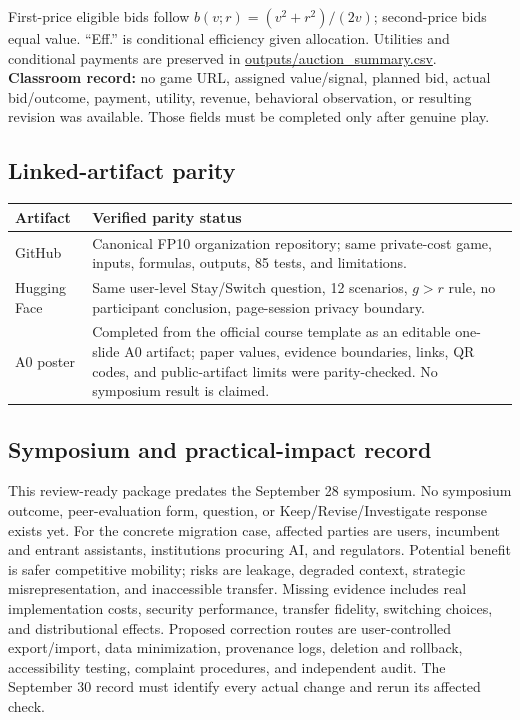 First-price eligible bids follow $b(v;r)=(v^2+r^2)/(2v)$; second-price bids equal value. ``Eff.'' is conditional efficiency given allocation. Utilities and conditional payments are preserved in \url{outputs/auction_summary.csv}. \textbf{Classroom record:} no game URL, assigned value/signal, planned bid, actual bid/outcome, payment, utility, revenue, behavioral observation, or resulting revision was available. Those fields must be completed only after genuine play.

\subsection{Linked-artifact parity}
\begin{tabularx}{\columnwidth}{@{}p{1.55cm}Y@{}}\toprule
\textbf{Artifact}&\textbf{Verified parity status}\\\midrule
GitHub&Canonical FP10 organization repository; same private-cost game, inputs, formulas, outputs, 85 tests, and limitations.\\
Hugging Face&Same user-level Stay/Switch question, 12 scenarios, $g>r$ rule, no participant conclusion, page-session privacy boundary.\\
A0 poster&Completed from the official course template as an editable one-slide A0 artifact; paper values, evidence boundaries, links, QR codes, and public-artifact limits were parity-checked. No symposium result is claimed.\\\bottomrule
\end{tabularx}

\subsection{Symposium and practical-impact record}
This review-ready package predates the September 28 symposium. No symposium outcome, peer-evaluation form, question, or Keep/\allowbreak Revise/\allowbreak Investigate response exists yet. For the concrete migration case, affected parties are users, incumbent and entrant assistants, institutions procuring AI, and regulators. Potential benefit is safer competitive mobility; risks are leakage, degraded context, strategic misrepresentation, and inaccessible transfer. Missing evidence includes real implementation costs, security performance, transfer fidelity, switching choices, and distributional effects. Proposed correction routes are user-controlled export/import, data minimization, provenance logs, deletion and rollback, accessibility testing, complaint procedures, and independent audit. The September 30 record must identify every actual change and rerun its affected check.
